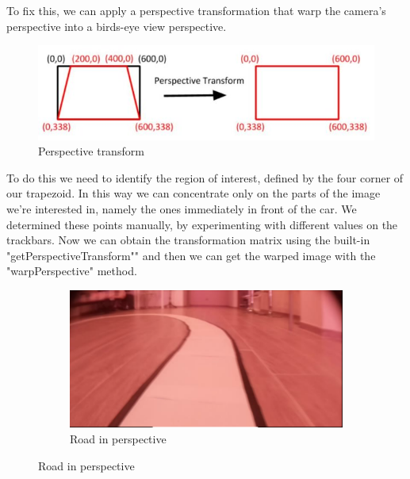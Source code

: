 \documentclass[12pt,a4paper]{article}
\begin{document}
\begin{large}
To fix this, we can apply a perspective transformation that warp the camera's perspective into a birds-eye view perspective.

\begin{figure} [!hb]
  \centering
  \captionsetup{justification=centering}
  \includegraphics{images/perspective_transform.jpg}
  \caption{Perspective transform}
  \end{figure}

To do this we need to identify the region of interest, defined by the four corner of our trapezoid. In this way we can concentrate only on the parts of the image we're interested in, namely the ones immediately in front of the car. We determined these points manually, by experimenting with different values on the trackbars. Now we can obtain the transformation matrix using the built-in "getPerspectiveTransform"" and then we can get the warped image with the "warpPerspective" method.

\begin{figure} [!hbp]
  \centering
    \begin{subfigure}[b]{0.3\textwidth}
    \centering
    \captionsetup{justification=centering}
      \includegraphics[width=\textwidth]{images/camera_perspective.png}
      \caption{Road in perspective}
      

\end{subfigure}
\end{figure}
\end{large}
\end{document}
